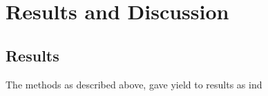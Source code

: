 \chapter{Results and Discussion}\label{chp:4}


\section{Results}

The methods as described above, gave yield to results as ind






